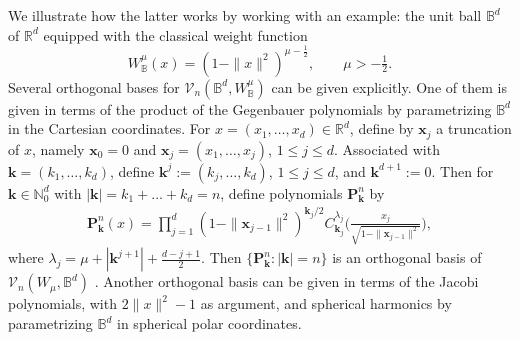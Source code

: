 \documentclass{amsart}
\theoremstyle{remark}
\def\sph{{\mathbb{S}^{d-1}}}
\def\kb{{\mathbf k}}
\def\xb{{\mathbf x}}
\def\Pb{{\mathbf P}}
\def\CH{{\mathcal H}}
\def\CV{{\mathcal V}}
\def\BB{{\mathbb B}}
\def\RR{{\mathbb R}}
\def\f{\frac}
\begin{document}
We illustrate how the latter works by working with an example: the unit ball $\BB^d$ of $\RR^d$ 
equipped with the classical weight function 
$$
  W_\BB^\mu(x) = (1-\|x\|^2)^{\mu-\f12}, \qquad \mu > -\tfrac12.   
$$
Several orthogonal bases for $\CV_n(\BB^d,W_\BB^\mu)$ can be given explicitly. One of them is 
given in terms of the product of the Gegenbauer polynomials by parametrizing $\BB^d$ 
in the Cartesian coordinates. For $x = (x_1, \ldots, x_d) \in \mathbb{R}^d$, define 
by $\xb_j$ a truncation of $x$, namely $\mathbf{x}_0 = 0$ and $\mathbf{x}_j = (x_1, \ldots, x_j)$, $1 \le j \le d$. 
Associated with $\kb = (k_1,\ldots, k_d)$, define $\kb^j := (k_j, \ldots, k_d)$, $1 \le j \le d$, and $\kb^{d+1} := 0$.
Then for $\kb \in \mathbb{N}_0^d$ with $|\kb| = k_1+\ldots + k_d =n$, define polynomials $\Pb_\kb^n$ by 
\begin{align}\label{secondb}
\Pb_\kb^n(x)  = \prod_{j=1}^d (1 - \| \mathbf{x}_{j-1} \|^2)^{\kb_j / 2}  C_{\kb_j}^{\lambda_j}\!\bigg(
      \frac{x_j}{\sqrt{1 - \| \mathbf{x}_{j-1} \|^2}} \bigg),
\end{align}
where $\lambda_j = \mu + |\kb^{j+1}| + \frac{d - j+1}{2}$. Then $\{\Pb_\kb^n: |\kb| = n\}$ is an orthogonal basis 
of $\mathcal{V}_n(W_\mu, \BB^d)$ \cite[Proposition 5.2.2]{DX}. Another orthogonal basis can be given in terms 
of the Jacobi polynomials, with $2\|x\|^2-1$ as argument, and spherical harmonics \cite[(5.2.4)]{DX} by 
parametrizing $\BB^d$ in spherical polar coordinates. 

\end{document}
